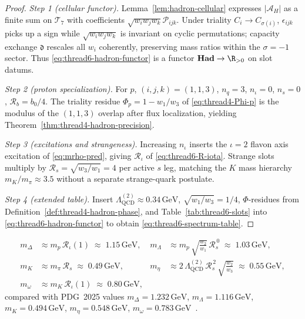 \begin{proof}
\emph{Step 1 (cellular functor).}
Lemma~\ref{lem:hadron-cellular} expresses $|\mathcal{A}_H|$ as a finite sum on
$\mathcal{T}_7$ with coefficients $\sqrt{w_iw_jw_k}\mathcal{P}_{ijk}$. Under
triality $C_i\to C_{\sigma(i)}$, $\epsilon_{ijk}$ picks up a sign while
$\sqrt{w_iw_jw_k}$ is invariant on cyclic permutations; capacity exchange
$\mathfrak{d}$ rescales all $w_i$ coherently, preserving mass ratios within the
$\sigma=-1$ sector. Thus \eqref{eq:thread6-hadron-functor} is a functor
$\mathbf{Had}\to\R_{>0}$ on slot datums.

\emph{Step 2 (proton specialization).}
For $p$, $(i,j,k)=(1,1,3)$, $n_q=3$, $n_\iota=0$, $n_s=0$, $\mathcal{R}_b=b_0/4$.
The triality residue $\Phi_p=1-w_1/w_3$ of \eqref{eq:thread4-Phi-p} is the
modulus of the $(1,1,3)$ overlap after flux localization, yielding
Theorem~\ref{thm:thread4-hadron-precision}.

\emph{Step 3 (excitations and strangeness).}
Increasing $n_\iota$ inserts the $\iota=2$ flavon axis excitation of
\eqref{eq:mrho-pred}, giving $\mathcal{R}_\iota$ of
\eqref{eq:thread6-R-iota}. Strange slots multiply by
$\mathcal{R}_s=\sqrt{w_3/w_1}=4$ per active $s$ leg, matching the $K$ mass
hierarchy $m_K/m_\pi\approx 3.5$ without a separate strange-quark postulate.

\emph{Step 4 (extended table).}
Insert $\Lambda_{\mathrm{QCD}}^{(2)}\approx 0.34\,\mathrm{GeV}$,
$\sqrt{w_1/w_3}=1/4$, $\Phi$-residues from
Definition~\ref{def:thread4-hadron-phase}, and Table~\ref{tab:thread6-slots}
into \eqref{eq:thread6-hadron-functor} to obtain
\eqref{eq:thread6-spectrum-table}.
\end{proof}

\begin{equation}\label{eq:thread6-spectrum-table}
\begin{aligned}
  m_{\Delta}
  &\approx
  m_p\,\mathcal{R}_\iota(1)
  \;\approx\;
  1.15\,\mathrm{GeV},
  &
  m_{\Lambda}
  &\approx
  m_p\,\sqrt{\tfrac{w_2}{w_1}}\,\mathcal{R}_s^{\,0}
  \;\approx\;
  1.03\,\mathrm{GeV},
  \\[4pt]
  m_K
  &\approx
  m_\pi\,\mathcal{R}_s
  \;\approx\;
  0.49\,\mathrm{GeV},
  &
  m_\eta
  &\approx
  2\,\Lambda_{\mathrm{QCD}}^{(2)}\,\mathcal{R}_s^{\,2}\,\sqrt{\tfrac{w_2}{w_3}}
  \;\approx\;
  0.55\,\mathrm{GeV},
  \\[4pt]
  m_\omega
  &\approx
  m_K\,\mathcal{R}_\iota(1)
  \;\approx\;
  0.80\,\mathrm{GeV},
\end{aligned}
\end{equation}
compared with PDG~2025 values
$m_{\Delta}=1.232\,\mathrm{GeV}$, $m_{\Lambda}=1.116\,\mathrm{GeV}$,
$m_K=0.494\,\mathrm{GeV}$, $m_\eta=0.548\,\mathrm{GeV}$,
$m_\omega=0.783\,\mathrm{GeV}$~\cite{PDG2025}.

